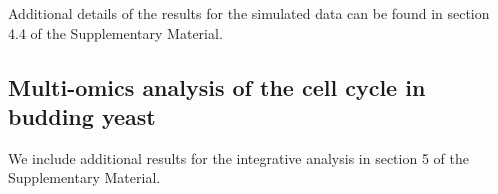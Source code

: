 \documentclass{bioinfo}
\begin{document}
Additional details of the results for the simulated data can be found in section 4.4 of the Supplementary Material.



%
%




\subsection{Multi-omics analysis of the cell cycle in budding yeast}
We include additional results for the integrative analysis in section 5 of the Supplementary Material.
\end{document}
